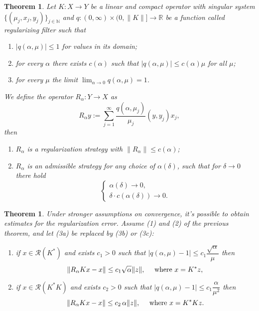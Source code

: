\documentclass[10pt, a4paper, twoside, openright]{book}
\theoremstyle{definition}
\theoremstyle{plain}
\newtheorem{theorem}[subsection]{Theorem}
\theoremstyle{plain}
\theoremstyle{plain}
\theoremstyle{plain}
\theoremstyle{plain}
\theoremstyle{plain}
\theoremstyle{plain}
\theoremstyle{plain}
\begin{document}
\begin{theorem}
\label{theo:regularization-filter}
 Let $K:X\to Y$ be a linear and compact operator with singular system $\{(\mu_j, x_j, y_j)\}_{j\in\mathbb{N}}$ and
 $q:(0, \infty)\times(0, \|K\|]\to \mathbb{R}$
 be a function called \emph{regularizing filter} such that
 \begin{enumerate}
  \item $|q(\alpha,\mu)|\leq 1$ for values in its domain;
  \item for every $\alpha$ there exists $c(\alpha)$ such that $ |q(\alpha, \mu)| \leq c(\alpha)\mu$ for all $\mu$;
  \item[3a.] for every $\mu$ the limit $ \lim_{\alpha\to0}q(\alpha,\mu) = 1$.
 \end{enumerate}
 We define the operator $R_\alpha:Y\to X$ as
 \begin{equation}
  R_\alpha y:=\sum_{j=1}^\infty \dfrac{q(\alpha,\mu_j)}{\mu_j}(y, y_j)x_j,
 \end{equation}
 then
 \begin{enumerate}
  \item $R_\alpha$ is a regularization strategy with $\|R_\alpha\|\leq c(\alpha)$;
  \item $R_\alpha$ is an admissible strategy for any choice of $\alpha(\delta)$, such that for $\delta\to 0$ there hold
  \begin{equation}
   \left\{
   \begin{aligned}
    \alpha(\delta) \to 0,\\
    \delta \cdot c(\alpha(\delta)) \to 0.
   \end{aligned}
   \right.
  \end{equation}
 \end{enumerate}
\end{theorem}
\begin{theorem}
 Under stronger assumptions on convergence, it's possible to obtain estimates for the regularization error.
 Assume (1) and (2) of the previous theorem, and let (3a) be replaced by (3b) or (3c):
 \begin{enumerate}
  \item[3b.] if $x\in\mathcal{R}(K^*)$ and exists $c_1>0$ such that $|q(\alpha,\mu) - 1|\leq c_1\dfrac{\sqrt{\alpha}}{\mu}$
  then
  \begin{equation}
   \|R_\alpha Kx - x\|\leq c_1\sqrt{\alpha}\|z\|,\quad \textup{ where }x=K^*z,
  \end{equation}
  \item[3c.] if $x\in\mathcal{R}(K^*K)$ and exists $c_2>0$ such that $|q(\alpha,\mu) - 1|\leq c_1\dfrac{\alpha}{\mu^2}$
  then
  \begin{equation}
   \|R_\alpha Kx - x\|\leq c_2\,\alpha\|z\|,\quad \textup{ where }x=K^*Kz.
  \end{equation}
 \end{enumerate}
\end{theorem}
\end{document}
